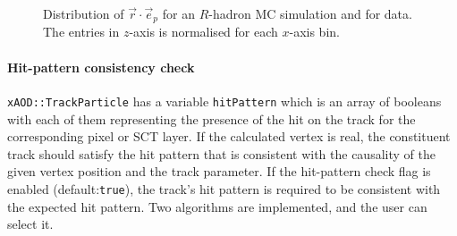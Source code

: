 \begin{figure}[t]
\begin{center}
\caption{Distribution of $\vec{r}\cdot\vec{e}_{p}$ for  an $R$-hadron MC simulation and  for data. The entries in $z$-axis is normalised for each $x$-axis bin.}
\label{fig:vPosDist}
\end{center}
\end{figure}


\paragraph{Hit-pattern consistency check}
          {\tt xAOD::TrackParticle} has a variable {\tt hitPattern} which is an array of booleans with each of them representing the presence of the hit on the track for the corresponding pixel or SCT layer. If the calculated vertex is real, the constituent track should satisfy the hit pattern that is consistent with the causality of the given vertex position and the track parameter. If the hit-pattern check flag is enabled (default:{\tt true}), the track's hit pattern is required to be consistent with the expected hit pattern. Two algorithms are implemented, and the user can select it.
          
